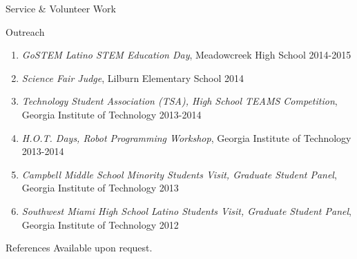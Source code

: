 \documentclass{resume} %
\newcommand{\sectionspace}{\vspace{3mm}}
\newcommand{\simplelistentry}[3]{\textit{#1}, {#2} \hfill {#3}}
\begin{document}
\begin{rSection}{Service \& Volunteer Work}
\begin{rSubsection}{Outreach}{}{}{}
\begin{enumerate}
\item \simplelistentry{GoSTEM Latino STEM Education Day}{Meadowcreek High
    School}{2014-2015}

\item \simplelistentry{Science Fair Judge}{Lilburn Elementary School}{2014}

\item \simplelistentry{Technology Student Association (TSA), High School TEAMS
    Competition}{Georgia Institute of Technology}{2013-2014}

\item \simplelistentry{H.O.T. Days, Robot Programming Workshop}{Georgia
    Institute of Technology}{2013-2014}

\item \simplelistentry{Campbell Middle School Minority Students Visit, Graduate
    Student Panel}{Georgia Institute of Technology}{2013}

\item \simplelistentry{Southwest Miami High School Latino Students Visit,
    Graduate Student Panel}{Georgia Institute of Technology}{2012}

\end{enumerate}
\end{rSubsection}

\end{rSection}





\sectionspace
\begin{rSection}{References}
Available upon request.
\end{rSection}


\end{document}

